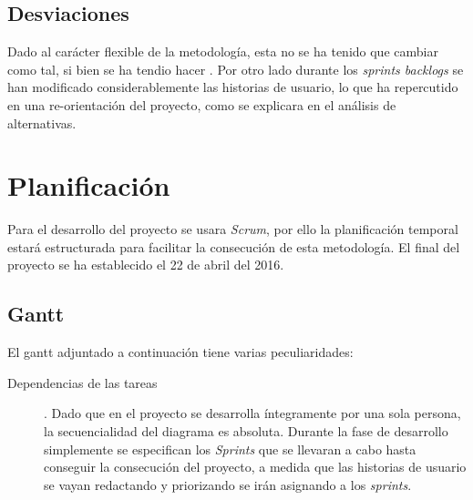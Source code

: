 \documentclass[12pt]{article} %
\begin{document}
\subsection{Desviaciones}
Dado al carácter flexible de la metodología, esta no se ha tenido que cambiar como tal, si bien se ha tendio hacer . Por otro lado durante los \textit{sprints backlogs} se han modificado considerablemente las historias de usuario, lo que ha repercutido en una re-orientación del proyecto, como se explicara en el análisis de alternativas.
\newpage

\section{Planificación}
Para el desarrollo del proyecto se usara \textit{Scrum}, por ello la planificación temporal estará estructurada para facilitar la consecución de esta metodología. El final del proyecto se ha establecido el 22 de abril del 2016.

\subsection{Gantt}
El gantt adjuntado a continuación tiene varias peculiaridades:
\begin{description}
\item [Dependencias de las tareas]. 
\linebreak Dado que en el proyecto se desarrolla íntegramente por una sola persona, la secuencialidad del diagrama es absoluta.
\linebreak Durante la fase de desarrollo simplemente se especifican los \textit{Sprints} que se llevaran a cabo hasta conseguir la consecución del proyecto, a medida que las historias de usuario se vayan redactando y priorizando se irán asignando a los \textit{sprints}.
\end{description}
\end{document}
